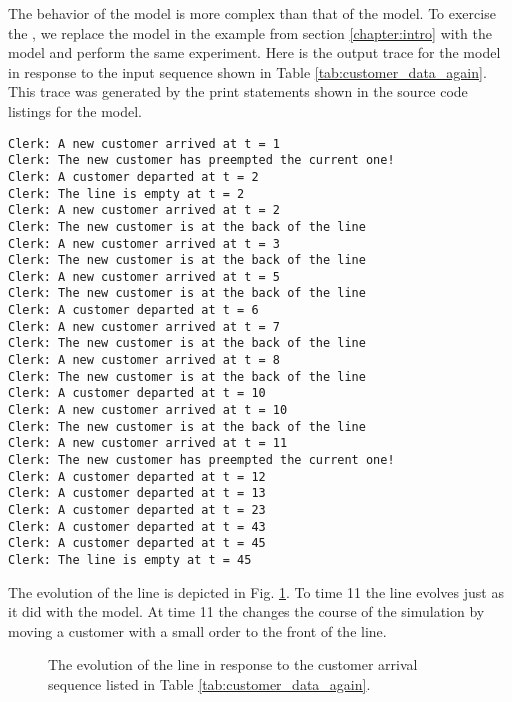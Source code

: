 The behavior of the  model is more complex than that of the  model. To exercise the , we replace the  model in the example from section \ref{chapter:intro} with the  model and perform the same experiment. Here is the output trace for the  model in response to the input sequence shown in Table \ref{tab:customer_data_again}. This trace was generated by the print statements shown in the source code listings for the  model.
\begin{verbatim}
Clerk: A new customer arrived at t = 1
Clerk: The new customer has preempted the current one!
Clerk: A customer departed at t = 2
Clerk: The line is empty at t = 2
Clerk: A new customer arrived at t = 2
Clerk: The new customer is at the back of the line
Clerk: A new customer arrived at t = 3
Clerk: The new customer is at the back of the line
Clerk: A new customer arrived at t = 5
Clerk: The new customer is at the back of the line
Clerk: A customer departed at t = 6
Clerk: A new customer arrived at t = 7
Clerk: The new customer is at the back of the line
Clerk: A new customer arrived at t = 8
Clerk: The new customer is at the back of the line
Clerk: A customer departed at t = 10
Clerk: A new customer arrived at t = 10
Clerk: The new customer is at the back of the line
Clerk: A new customer arrived at t = 11
Clerk: The new customer has preempted the current one!
Clerk: A customer departed at t = 12
Clerk: A customer departed at t = 13
Clerk: A customer departed at t = 23
Clerk: A customer departed at t = 43
Clerk: A customer departed at t = 45
Clerk: The line is empty at t = 45
\end{verbatim}

The evolution of the  line is depicted in Fig. \ref{fig:clerk2_line}. To time 11 the line evolves just as it did with the  model. At time 11 the  changes the course of the simulation by moving a customer with a small order to the front of the line.
\begin{figure}[ht]
\centering
{}
\caption{The evolution of the  line in response to the customer arrival sequence listed in Table \ref{tab:customer_data_again}.}
\label{fig:clerk2_line}
\end{figure}
